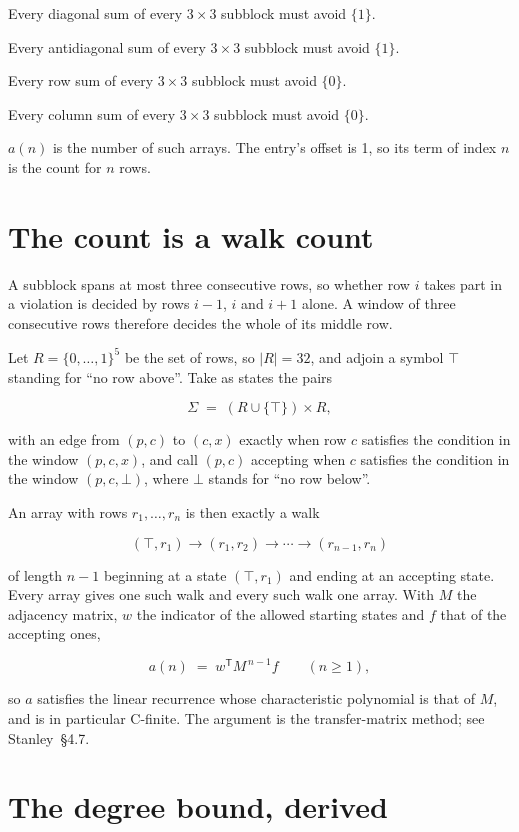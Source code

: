 \documentclass[11pt]{article}
\theoremstyle{definition}
\begin{document}
Every diagonal sum of every $3\times3$ subblock must avoid $\{1\}$.

Every antidiagonal sum of every $3\times3$ subblock must avoid $\{1\}$.

Every row sum of every $3\times3$ subblock must avoid $\{0\}$.

Every column sum of every $3\times3$ subblock must avoid $\{0\}$.

$a(n)$ is the number of such arrays. The entry's offset is 1, so its term of index $n$ is the count for $n$ rows.

\section{The count is a walk count}

A subblock spans at most three consecutive rows, so whether row $i$ takes part in a violation is decided by rows $i-1$, $i$ and $i+1$ alone. A window of three consecutive rows therefore decides the whole of its middle row.

Let $R = \{0,\dots,1\}^{5}$ be the set of rows, so $|R| = 32$, and adjoin a symbol $\top$ standing for ``no row above''. Take as states the pairs

\[\Sigma \;=\; (R \cup \{\top\}) \times R,\]

with an edge from $(p,c)$ to $(c,x)$ exactly when row $c$ satisfies the condition in the window $(p,c,x)$, and call $(p,c)$ accepting when $c$ satisfies the condition in the window $(p,c,\bot)$, where $\bot$ stands for ``no row below''.

An array with rows $r_1,\dots,r_n$ is then exactly a walk

\[(\top,r_1) \to (r_1,r_2) \to \cdots \to (r_{n-1},r_n)\]

of length $n-1$ beginning at a state $(\top,r_1)$ and ending at an accepting state. Every array gives one such walk and every such walk one array. With $M$ the adjacency matrix, $w$ the indicator of the allowed starting states and $f$ that of the accepting ones,

\[a(n) \;=\; w^{\mathsf T} M^{\,n-1} f \qquad (n \ge 1),\]

so $a$ satisfies the linear recurrence whose characteristic polynomial is that of $M$, and is in particular C-finite. The argument is the transfer-matrix method; see Stanley~\S4.7.

\section{The degree bound, derived}
\end{document}
